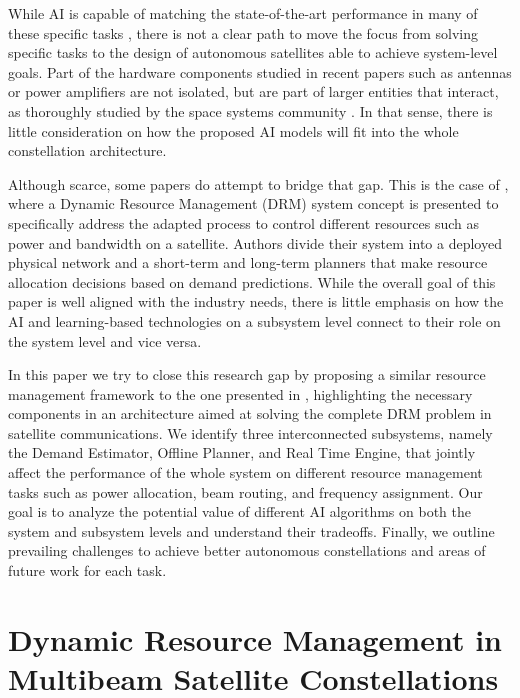 \documentclass[letterpaper]{article} %
\begin{document}
While AI is capable of matching the state-of-the-art performance in many of these specific tasks \cite{Luis2020, Aravanis2015, Paris2019, Lei2010, Durand2017, Ferreira2018, Luis2019}, there is not a clear path to move the focus from solving specific tasks to the design of autonomous satellites able to achieve system-level goals. Part of the hardware components studied in recent papers such as antennas or power amplifiers are not isolated, but are part of larger entities that interact, as thoroughly studied by the space systems community \cite{Angeletti2008}. In that sense, there is little consideration on how the proposed AI models will fit into the whole constellation architecture.


Although scarce, some papers do attempt to bridge that gap. This is the case of \cite{Guerster2019}, where a Dynamic Resource Management (DRM) system concept is presented to specifically address the adapted process to control different resources such as power and bandwidth on a satellite. Authors divide their system into a deployed physical network and a short-term and long-term planners that make resource allocation decisions based on demand predictions. While the overall goal of this paper is well aligned with the industry needs, there is little emphasis on how the AI and learning-based technologies on a subsystem level connect to their role on the system level and vice versa.

In this paper we try to close this research gap by proposing a similar resource management framework to the one presented in \cite{Guerster2019}, highlighting the necessary components in an architecture aimed at solving the complete DRM problem in satellite communications. We identify three interconnected subsystems, namely the Demand Estimator, Offline Planner, and Real Time Engine, that jointly affect the performance of the whole system on different resource management tasks such as power allocation, beam routing, and frequency assignment. Our goal is to analyze the potential value of different AI algorithms on both the system and subsystem levels and understand their tradeoffs. Finally, we outline prevailing challenges to achieve better autonomous constellations and areas of future work for each task.






\section{Dynamic Resource Management in Multibeam Satellite Constellations}
\label{sec:2}
\end{document}
